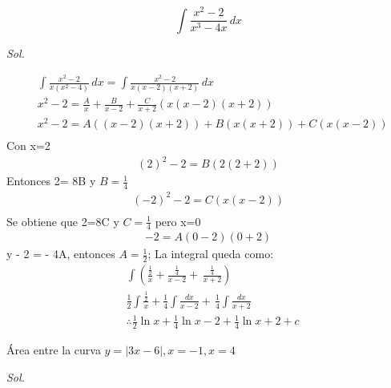 \begin{problem}
    \begin{equation}
        \int \frac{x^2-2}{x^3 - 4x}\,dx
    \end{equation}

    \textit{ Sol. }

    \begin{align*}
        &\int \frac{x^2-2}{x\left(x^2 - 4\right)}\,dx = \int \frac{x^2 -2}{x\left(x - 2\right)\left(x + 2\right)}\,dx\\
        &x^2- 2 = \frac{A}{x} + \frac{B}{x - 2} + \frac{C}{x + 2}\left(x(x - 2)(x +2)\right)\\
        &x^2 - 2 = A\left( (x - 2)(x +2) \right) + B \left(x(x + 2)\right) + C\left(x(x - 2)\right)\\ 
    \end{align*}
Con x=2
\begin{align*}
    (2)^2 - 2 = B\left(2(2 + 2)\right)
\end{align*}
Entonces 2= 8B y $B= \frac{1}{4}$
\begin{align*}
    (- 2)^2- 2 = C\left(x(x - 2)\right)\\
\end{align*}
Se obtiene que 2=8C y $C=\frac{1}{4}$ pero x=0
\begin{align*}
    - 2 = A(0 - 2)(0 + 2)
\end{align*}
y - 2 = - 4A, entonces $A =\frac{1}{2}$; La integral queda como:
\begin{align*}
    &\int \left( \frac{\frac{1}{2}}{x} + \frac{\frac{1}{4}}{x - 2} +\, \frac{\frac{1}{4}}{x + 2}\right)\\
    &\frac{1}{2 }\int \frac{\frac{1}{2}}{x} + \frac{1}{4}\int \frac{dx}{x - 2} +\, \frac{1}{4}\int \frac{dx}{x + 2}\\
    &\therefore\frac{1}{2}\ln{x} + \frac{1}{4}\ln{x - 2} + \frac{1}{4}\ln{x + 2} + c
\end{align*}
\end{problem}

\begin{problem}[a]
    Área entre la curva $y=\left\lvert 3x-6\right\rvert,x=-1, x=4 $

    \textit{ Sol. }


\end{problem}



